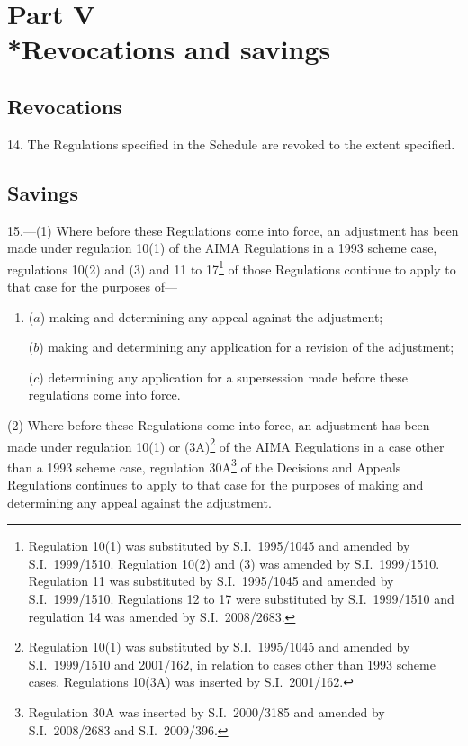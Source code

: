 \documentclass[12pt,a4paper]{article}
\begin{document}
\section[Part V --- Revocations and savings]{Part V\\*Revocations and savings}

\renewcommand\parthead{--- Part V}

\subsection[14. Revocations]{Revocations}

14.  The Regulations specified in the Schedule are revoked to the extent specified.

\subsection[15. Savings]{Savings}

15.---(1)  Where before these Regulations come into force, an adjustment has been made under regulation 10(1) of the AIMA Regulations in a 1993 scheme case, regulations 10(2) and (3) and 11 to 17\footnote{Regulation 10(1) was substituted by S.I.~1995/1045 and amended by S.I.~1999/1510. Regulation 10(2) and (3) was amended by S.I.~1999/1510. Regulation 11 was substituted by S.I.~1995/1045 and amended by S.I.~1999/1510. Regulations 12 to 17 were substituted by S.I.~1999/1510 and regulation 14 was amended by S.I.~2008/2683.} of those Regulations continue to apply to that case for the purposes of—
\begin{enumerate}\item[]
($a$) making and determining any appeal against the adjustment;

($b$) making and determining any application for a revision of the adjustment;

($c$) determining any application for a supersession made before these regulations come into force.
\end{enumerate}

(2) Where before these Regulations come into force, an adjustment has been made under regulation 10(1) or (3A)\footnote{Regulation 10(1) was substituted by S.I.~1995/1045 and amended by S.I.~1999/1510 and 2001/162, in relation to cases other than 1993 scheme cases. Regulations 10(3A) was inserted by S.I.~2001/162.} of the AIMA Regulations in a case other than a 1993 scheme case, regulation 30A\footnote{Regulation 30A was inserted by S.I.~2000/3185 and amended by S.I.~2008/2683 and S.I.~2009/396.} of the Decisions and Appeals Regulations continues to apply to that case for the purposes of making and determining any appeal against the adjustment. 
\end{document}
